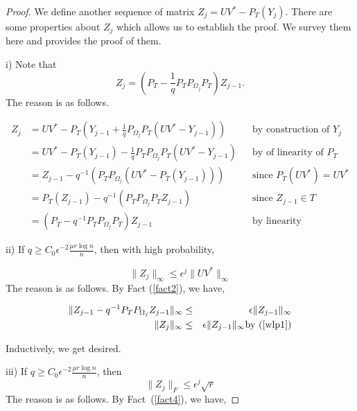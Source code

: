 \begin{proof}
We define another sequence of matrix $Z_{j}=UV^{*}-P_{T}(Y_{j})$. There are some properties about $Z_{j}$ which allows us to establish the proof. We survey them here and provides the proof of them.

i) Note that
\begin{equation}
Z_{j} = \left( P_{T}-\frac{1}{q}P_{T}P_{\Omega_{j}}P_{T} \right) Z_{j-1}. \label{wlp1}
\end{equation}
The reason is as follows.

\[
\begin{aligned}
Z_{j}
 & = UV^{*} - P_{T} \left( Y_{j-1} + \frac{1}{q}P_{\Omega_{j}} P_{T}(UV^{*}-Y_{j-1}) \right)
 &&\text{by construction of } Y_j \\
 & = UV^{*} - P_{T} ( Y_{j-1}) - \frac{1}{q}P_{T} P_{\Omega_{j}} P_{T}( UV^{*} - Y_{j-1} )
 &&\text{by of linearity of } P_{T}\\
 & = Z_{j-1} - q^{-1}(P_{T}P_{\Omega_{j}}(UV^{*}-P_{T}(Y_{j-1})))
 &&\text{since } P_{T}(UV^{*}) = UV^{*}\\
 & = P_{T}(Z_{j-1}) - q^{-1}(P_{T}P_{\Omega_{j}}P_{T}Z_{j-1})
 &&\text{since } Z_{j-1}\in T\\
 & = ( P_{T} - q^{-1} P_{T} P_{\Omega_{j}} P_{T} ) Z_{j-1}
 &&\text{by linearity}
\end{aligned}
\]

ii) If $q\ge C_{0}\epsilon^{-2}\frac{\mu r\log n}{n}$, then  with high probability,

\begin{equation}
\| Z_{j}\|_{\infty}\le\epsilon^{j}\|UV^{*}\|_{\infty} \label{wlp2}
\end{equation}
The reason is as follows. By Fact (\ref{fact2}), we have,

\begin{eqnarray*}
\|Z_{j-1}-q^{-1}P_{T}P_{\Omega_{j}}Z_{j-1}\|_{\infty} & \le & \epsilon\|Z_{j-1}\|_{\infty} \\
\|Z_{j}\|_{\infty} & \le & \epsilon\|Z_{j-1}\|_{\infty} \text{by (\ref{wlp1})}
\end{eqnarray*}


Inductively, we get desired.

iii) If $q\ge C_{0}\epsilon^{-2}\frac{\mu r\log n}{n}$, then
\begin{equation}
\|Z_{j}\|_{F}\le\epsilon^{j}\sqrt{r}  \label{wlp3}
\end{equation}
The reason is as follows. By Fact~(\ref{fact4}), we have,


\end{proof}
